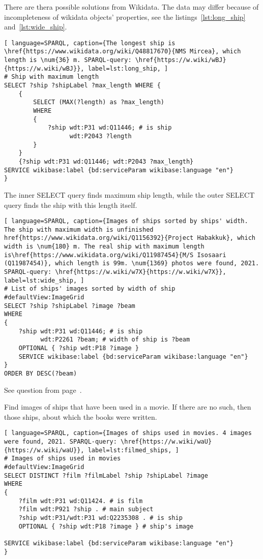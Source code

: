 There are thera possible solutions from Wikidata. The data may differ because of incompleteness of wikidata objects' properties, see the listings~\ref{lst:long_ship} and~\ref{lst:wide_ship}.
\begin{lstlisting}[ language=SPARQL, caption={The longest ship is \href{https://www.wikidata.org/wiki/Q48817670}{NMS Mircea}, which length is \num{36} m. SPARQL-query: \href{https://w.wiki/wBJ}{https://w.wiki/wBJ}}, label=lst:long_ship, ]
# Ship with maximum length
SELECT ?ship ?shipLabel ?max_length WHERE {
	{
		SELECT (MAX(?length) as ?max_length)
		WHERE
		{
			?ship wdt:P31 wd:Q11446; # is ship
				  wdt:P2043 ?length
		}
	}
	{?ship wdt:P31 wd:Q11446; wdt:P2043 ?max_length}
SERVICE wikibase:label {bd:serviceParam wikibase:language "en"}
}  
\end{lstlisting}

The inner SELECT query finds maximum ship length, while the outer SELECT query finds the ship with this length itself.

\begin{lstlisting}[ language=SPARQL, caption={Images of ships sorted by ships' width. The ship with maximum width is unfinished href{https://www.wikidata.org/wiki/Q1156392}{Project Habakkuk}, which width is \num{180} m. The real ship with maximum length is\href{https://www.wikidata.org/wiki/Q11987454}{M/S Isosaari (Q11987454)}, which length is 99m. \num{1369} photos were found, 2021. SPARQL-query: \href{https://w.wiki/w7X}{https://w.wiki/w7X}}, label=lst:wide_ship, ]
# List of ships' images sorted by width of ship
#defaultView:ImageGrid
SELECT ?ship ?shipLabel ?image ?beam
WHERE 
{
	?ship wdt:P31 wd:Q11446; # is ship
		  wdt:P2261 ?beam; # width of ship is ?beam
	OPTIONAL { ?ship wdt:P18 ?image }
	SERVICE wikibase:label {bd:serviceParam wikibase:language "en"}
}
ORDER BY DESC(?beam)
\end{lstlisting}

\small{See question from page~\pageref{question:ship_2}.}


\begin{exercise}
	\label{answer:ship_3}
	Find images of ships that have been used in a movie. If there are no such, then those ships, about which the books were written.
\end{exercise}

\begin{lstlisting}[ language=SPARQL, caption={Images of ships used in movies. 4 images were found, 2021. SPARQL-query: \href{https://w.wiki/waU}{https://w.wiki/waU}}, label=lst:filmed_ships, ]
# Images of ships used in movies
#defaultView:ImageGrid
SELECT DISTINCT ?film ?filmLabel ?ship ?shipLabel ?image
WHERE
{
	?film wdt:P31 wd:Q11424. # is film	
	?film wdt:P921 ?ship . # main subject
	?ship wdt:P31/wdt:P31 wd:Q2235308 . # is ship
	OPTIONAL { ?ship wdt:P18 ?image } # ship's image
						
SERVICE wikibase:label {bd:serviceParam wikibase:language "en"}
}
\end{lstlisting}

